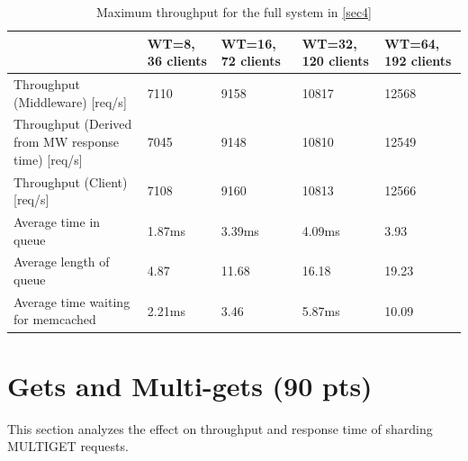 \documentclass[11pt,a4paper]{article}
\begin{document}
\begin{center}
\begin{table}
	\begin{tabular}{|l|p{1.7cm}|p{1.7cm}|p{1.75cm}|p{1.75cm}|}
		\hline                                            & WT=8, 36 clients & WT=16, 72 clients  & WT=32, 120 clients   & WT=64, 192 clients   \\ 
		\hline Throughput (Middleware) [req/s]           & 7110              & 9158                & 10817                 & 12568                 \\ 
		\hline Throughput (Derived from MW response time) [req/s] & 7045       & 9148               & 10810           & 12549         \\
		\hline Throughput (Client) [req/s]                & 7108              & 9160                & 10813                 & 12566                 \\ 
		\hline Average time in queue                      & 1.87ms            & 3.39ms              & 4.09ms                & 3.93                  \\ 
		\hline Average length of queue                    & 4.87              & 11.68               & 16.18                 & 19.23                 \\ 
		\hline Average time waiting for memcached         & 2.21ms            & 3.46                & 5.87ms                & 10.09                 \\ 
		\hline 
	\end{tabular}
	\caption{Maximum throughput for the full system in \autoref{sec4}} \label{res4}
\end{table}
\end{center}


\section{Gets and Multi-gets (90 pts)}

This section analyzes the effect on throughput and response time of sharding MULTIGET requests.
\end{document}

